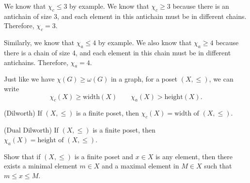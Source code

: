 We know that \( \chi_c \le 3 \) by example. We know that \( \chi_c \ge 3 \) because there is an antichain of size 3, and each element in this antichain must be in different chains. Therefore, \( \chi_c = 3 \).

Similarly, we know that \( \chi_a \le 4 \) by example. We also know that \( \chi_a \ge 4 \) because there is a chain of size 4, and each element in this chain must be in different antichains. Therefore, \( \chi_a = 4 \).

\begin{note}
	Just like we have \( \chi(G) \ge \omega(G) \) in a graph, for a poset \( (X, \le ) \), we can write \[
		\chi_c(X) \ge \text{width}(X) \qquad \chi_a(X) > \text{height}(X)
	.\] 
\end{note}

\begin{theorem}
	(Dilworth) If \( (X, \le ) \) is a finite poset, then \( \chi_c(X) = \text{width of } (X,\le )\).
\end{theorem}

\begin{theorem}
	(Dual Dilworth) If \( (X, \le ) \) is a finite poset, then \( \chi_a(X) = \text{height of } (X,\le )\).
\end{theorem}

Show that if \( (X,\le ) \) is a finite poset and \( x \in X \) is any element, then there exists a minimal element \( m \in X \) and a maximal element in \( M \in X \) such that \( m \le x \le M \).
